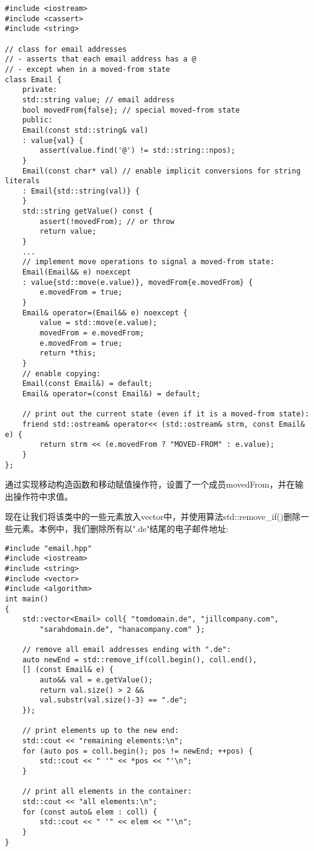 \begin{lstlisting}[caption={}]
#include <iostream>
#include <cassert>
#include <string>

// class for email addresses
// - asserts that each email address has a @
// - except when in a moved-from state
class Email {
	private:
	std::string value; // email address
	bool movedFrom{false}; // special moved-from state
	public:
	Email(const std::string& val)
	: value{val} {
		assert(value.find('@') != std::string::npos);
	}
	Email(const char* val) // enable implicit conversions for string literals
	: Email{std::string(val)} {
	}
	std::string getValue() const {
		assert(!movedFrom); // or throw
		return value;
	}
	...
	// implement move operations to signal a moved-from state:
	Email(Email&& e) noexcept
	: value{std::move(e.value)}, movedFrom{e.movedFrom} {
		e.movedFrom = true;
	}
	Email& operator=(Email&& e) noexcept {
		value = std::move(e.value);
		movedFrom = e.movedFrom;
		e.movedFrom = true;
		return *this;
	}
	// enable copying:
	Email(const Email&) = default;
	Email& operator=(const Email&) = default;
	
	// print out the current state (even if it is a moved-from state):
	friend std::ostream& operator<< (std::ostream& strm, const Email& e) {
		return strm << (e.movedFrom ? "MOVED-FROM" : e.value);
	}
};
\end{lstlisting}

通过实现移动构造函数和移动赋值操作符，设置了一个成员movedFrom，并在输出操作符中求值。\par

现在让我们将该类中的一些元素放入vector中，并使用算法std::remove\_if()删除一些元素。本例中，我们删除所有以".de"结尾的电子邮件地址:\par

{\color{red}{lib/removeif.cpp}}\par

\begin{lstlisting}[caption={}]
#include "email.hpp"
#include <iostream>
#include <string>
#include <vector>
#include <algorithm>
int main()
{
	std::vector<Email> coll{ "tomdomain.de", "jillcompany.com",
		"sarahdomain.de", "hanacompany.com" };
	
	// remove all email addresses ending with ".de":
	auto newEnd = std::remove_if(coll.begin(), coll.end(),
	[] (const Email& e) {
		auto&& val = e.getValue();
		return val.size() > 2 &&
		val.substr(val.size()-3) == ".de";
	});

	// print elements up to the new end:
	std::cout << "remaining elements:\n";
	for (auto pos = coll.begin(); pos != newEnd; ++pos) {
		std::cout << " '" << *pos << "'\n";
	}

	// print all elements in the container:
	std::cout << "all elements:\n";
	for (const auto& elem : coll) {
		std::cout << " '" << elem << "'\n";
	}
}
\end{lstlisting}

